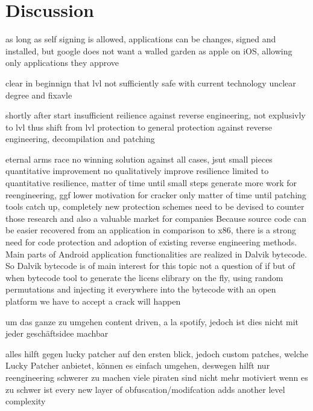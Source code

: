 \section{Discussion} \label{section:conclusion-discussion}

as long as self signing is allowed, applications can be changes, signed and installed, but google does not want a walled garden as apple on iOS, allowing only applications they approve\cite{codeSigning} \cite{androidSigning}


clear in beginnign that lvl not sufficiently safe with current technology
unclear degree and fixavle

shortly after start insufficient reilience against reverse engineering, not explusivly to lvl
thus shift from lvl protection to general protection against reverse engineering, decompilation and patching

eternal arms race
no winning solution against all cases, jsut small pieces quantitative improvement
no qualitatively improve resilience
limited to quantitative resilience, matter of time until small steps
generate more work for reengineering, ggf lower motivation for cracker
only matter of time until patching tools catch up, completely new protection schemes need to be devised to counter those
\cite{munteanLicense}
%
research and also a valuable market for companies\newline
Because source code can be easier recovered from an application in comparison
to x86, there is a strong need for code protection and adoption of existing reverse engineering methods. Main parts of Android application functionalities are realized in Dalvik bytecode. So Dalvik bytecode is of main interest for this topic
\cite{schulzLabCourse}
%
not a question of if but of when
bytecode tool to generate the licens elibrary on the fly, using random  permutations and injecting it everywhere into the bytecode
with an open platform we have to accept a crack will happen
\cite{digipomLvl}
%


um das ganze zu umgehen content driven, a la spotify, jedoch ist dies nicht mit jeder geschäftsidee machbar

alles hilft gegen lucky patcher auf den ersten blick, jedoch custom patches, welche Lucky Patcher anbietet\cite{munteanLicense}, können es einfach umgehen,
deswegen hilft nur reengineering schwerer zu machen
viele piraten sind nicht mehr motiviert wenn es zu schwer ist\newline
every new layer of obfuscation/modifcation adds another level complexity\newline

